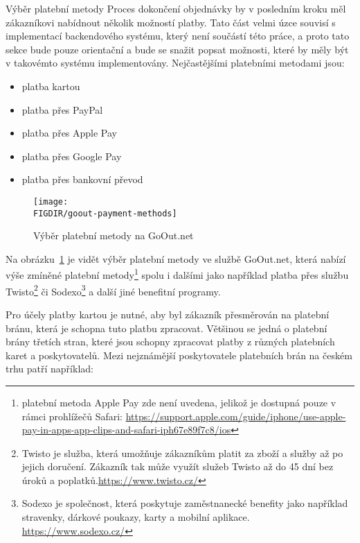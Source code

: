 \begin{subsection}{Výběr platební metody}
    \label{subsec:identifikace-dokonceni-objednavky-vyber-platebni-metody}
    Proces dokončení objednávky by v posledním kroku měl zákazníkovi nabídnout několik možností platby.
    Tato část velmi úzce souvisí s implementací backendového systému, který není součástí této práce, a proto tato sekce bude pouze orientační a bude se snažit popsat možnosti, které by měly být v takovémto systému implementovány.
    Nejčastějšími platebními metodami jsou:

    \begin{itemize}
        \item platba kartou
        \item platba přes PayPal
        \item platba přes Apple Pay
        \item platba přes Google Pay
        \item platba přes bankovní převod
    \end{itemize}

    \begin{figure}[H]
        \texttt{[image: \\FIGDIR/goout-payment-methods]}
        \centering
        \caption{Výběr platební metody na GoOut.net\cite{g__goout_net}}
        \label{fig:goout-payment-methods}
    \end{figure}

    Na obrázku~\ref{fig:goout-payment-methods} je vidět výběr platební metody ve službě GoOut.net, která nabízí výše zmíněné platební metody\footnote{platební metoda Apple Pay zde není uvedena, jelikož je dostupná pouze v rámci prohlížečů Safari: \url{https://support.apple.com/guide/iphone/use-apple-pay-in-apps-app-clips-and-safari-iph67e89f7c8/ios}} spolu i dalšími jako například platba přes službu Twisto\footnote{Twisto je služba, která umožňuje zákazníkům platit za zboží a služby až po jejich doručení. Zákazník tak může využít služeb Twisto až do 45 dní bez úroků a poplatků.\url{https://www.twisto.cz/}} či Sodexo\footnote{Sodexo je společnost, která poskytuje zaměstnanecké benefity jako například stravenky, dárkové poukazy, karty a mobilní aplikace. \url{https://www.sodexo.cz/}} a další jiné benefitní programy.

    Pro účely platby kartou je nutné, aby byl zákazník přesměrován na platební bránu, která je schopna tuto platbu zpracovat.
    Většinou se jedná o platební brány třetích stran, které jsou schopny zpracovat platby z různých platebních karet a poskytovatelů.
    Mezi nejznámější poskytovatele platebních brán na českém trhu patří například:


\end{subsection}

